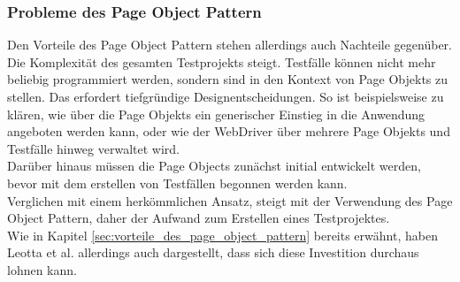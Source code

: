 \subsubsection{Probleme des Page Object Pattern}
\label{sec:probleme_des_page_object_pattern}

Den Vorteile des Page Object Pattern stehen allerdings auch Nachteile gegenüber. Die Komplexität des gesamten Testprojekts steigt. Testfälle können nicht mehr beliebig programmiert werden, sondern sind in den Kontext von Page Objekts zu stellen. Das erfordert tiefgründige Designentscheidungen. So ist beispielsweise zu klären, wie über die Page Objekts ein generischer Einstieg in die Anwendung angeboten werden kann, oder wie der WebDriver über mehrere Page Objekts und Testfälle hinweg verwaltet wird.\\
Darüber hinaus müssen die Page Objects zunächst initial entwickelt werden, bevor mit dem erstellen von Testfällen begonnen werden kann.\\
Verglichen mit einem herkömmlichen Ansatz, steigt mit der Verwendung des Page Object Pattern, daher der Aufwand zum Erstellen eines Testprojektes.\\
Wie in Kapitel \ref{sec:vorteile_des_page_object_pattern} bereits erwähnt, haben 
Leotta et al. \cite{leotta_repairing_2013} allerdings auch dargestellt, dass sich diese Investition durchaus lohnen kann.

